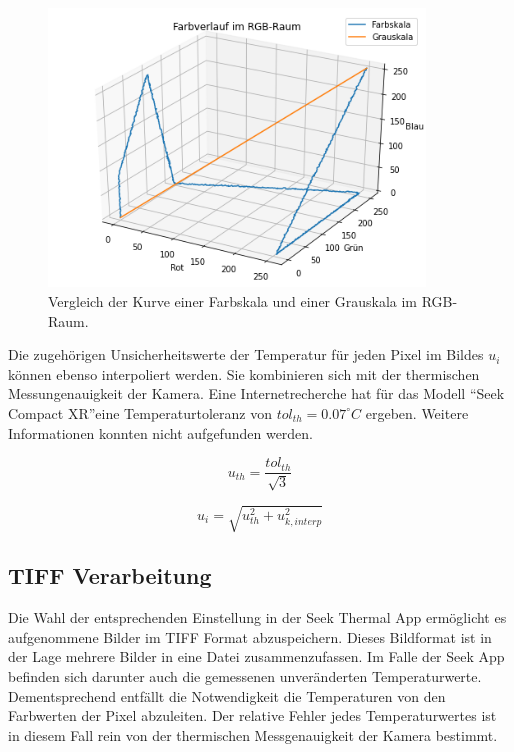 \documentclass{article}
\begin{document}
\begin{figure}[H]
    \centering
    \captionsetup{width=8cm}
    \includegraphics[width=10cm]{img/farb_vs_grau.png}
    \caption{Vergleich der Kurve einer Farbskala und einer Grauskala im RGB-Raum.}
\end{figure}

Die zugehörigen Unsicherheitswerte der Temperatur für jeden Pixel im Bildes $u_i$ können ebenso interpoliert werden.
Sie kombinieren sich mit der thermischen Messungenauigkeit der Kamera.
Eine Internetrecherche hat für das Modell \textquotedblleft Seek Compact XR\textquotedblright eine Temperaturtoleranz von $tol_{th} = 0.07 ^{\circ}C$ ergeben.
Weitere Informationen konnten nicht aufgefunden werden.

\begin{equation}
    u_{th} = \frac{tol_{th}}{\sqrt{3}}
\end{equation}

\begin{equation}
   u_i = \sqrt{ u_{th}^2 + u_{k,interp}^2 } 
\end{equation}

\subsection{TIFF Verarbeitung}
Die Wahl der entsprechenden Einstellung in der Seek Thermal App ermöglicht es aufgenommene Bilder im TIFF Format abzuspeichern. 
Dieses Bildformat ist in der Lage mehrere Bilder in eine Datei zusammenzufassen.
Im Falle der Seek App befinden sich darunter auch die gemessenen unveränderten Temperaturwerte.
Dementsprechend entfällt die Notwendigkeit die Temperaturen von den Farbwerten der Pixel abzuleiten.
Der relative Fehler jedes Temperaturwertes ist in diesem Fall rein von der thermischen Messgenauigkeit der Kamera bestimmt.
\end{document}
